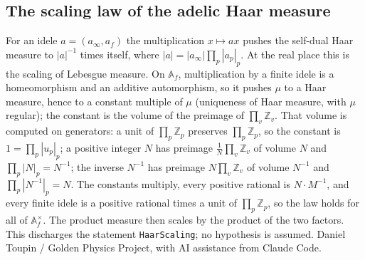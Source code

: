 \documentclass{report}
\theoremstyle{definition}
\begin{document}
\begin{itemize}
\begin{itemize}
\section{The scaling law of the adelic Haar measure}
For an idele $a=(a_\infty,a_f)$ the multiplication $x\mapsto ax$ pushes the self-dual Haar measure to $|a|^{-1}$ times itself, where $|a|=|a_\infty|\prod_p|a_p|_p$. At the real place this is the scaling of Lebesgue measure. On $\mathbb A_f$, multiplication by a finite idele is a homeomorphism and an additive automorphism, so it pushes $\mu$ to a Haar measure, hence to a constant multiple of $\mu$ (uniqueness of Haar measure, with $\mu$ regular); the constant is the volume of the preimage of $\prod_v\mathbb Z_v$. That volume is computed on generators: a unit of $\prod_p\mathbb Z_p$ preserves $\prod_p\mathbb Z_p$, so the constant is $1=\prod_p|u_p|_p$; a positive integer $N$ has preimage $\frac1N\prod_v\mathbb Z_v$ of volume $N$ and $\prod_p|N|_p=N^{-1}$; the inverse $N^{-1}$ has preimage $N\prod_v\mathbb Z_v$ of volume $N^{-1}$ and $\prod_p|N^{-1}|_p=N$. The constants multiply, every positive rational is $N\cdot M^{-1}$, and every finite idele is a positive rational times a unit of $\prod_p\mathbb Z_p$, so the law holds for all of $\mathbb A_f^\times$. The product measure then scales by the product of the two factors. This discharges the statement \texttt{HaarScaling}; no hypothesis is assumed.
Daniel Toupin / Golden Physics Project, with AI assistance from Claude Code.



\end{itemize}
\end{itemize}
\end{document}

